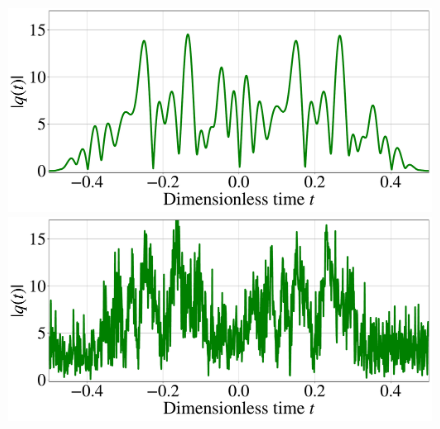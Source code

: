 \begin{figure}[htbp]
\centering
\begin{minipage}{.47\textwidth}
  \centering
  \includegraphics[width=1.\linewidth]{images/nn_nft/scirep_signal_example.pdf}
\end{minipage}%
\hfill
\begin{minipage}{.47\textwidth}
  \centering
  \includegraphics[width=1.\linewidth]{images/nn_nft/scirep_signal_wn_example.pdf}
\end{minipage}
\\


\end{figure}
